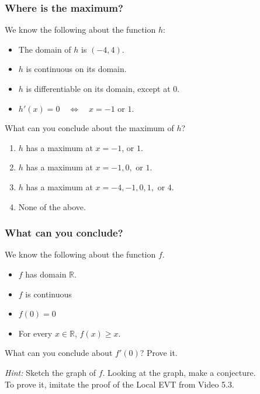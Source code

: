 \begin{frame}[t]
	\frametitle{Where is the maximum?}

	We know the following about the function $h$:
	\begin{itemize}
		\item The domain of $h$ is $\displaystyle (-4,4)$.

		\item $h$ is continuous on its domain.

		\item $h$ is differentiable on its domain, except at $0$.

		\item $h'(x) = 0 \quad \iff \quad x=-1 \text{ or }1$.
	\end{itemize}

	\begin{block}{What can you conclude about the maximum of $h$?}
		\begin{enumerate}
			\item $h$ has a maximum at $x=-1$, or $1$.

			\item $h$ has a maximum at $x=-1,0,$ or $1$.

			\item $h$ has a maximum at $x=-4, -1,0, 1,$ or $4$.

			\item None of the above.
		\end{enumerate}
	\end{block}
\end{frame}

\begin{frame}[t]
	\frametitle{What can you conclude?}

	We know the following about the function $f$.
	\begin{itemize}
		\item $f$ has domain $\mathbb{R}$.

		\item $f$ is continuous

		\item $f(0)=0$

		\item For every $x \in \mathbb{R}$, $f(x) \geq x$.
	\end{itemize}
	\begin{block}{}
		What can you conclude about $f'(0)$? Prove it.
	\end{block}

	\vfill

	\emph{Hint:} Sketch the graph of $f$. Looking at the graph, make a conjecture.
	\\ To prove it, imitate the proof of the Local EVT from Video 5.3.
\end{frame}

